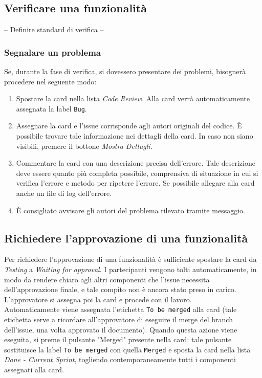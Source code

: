 \subsection{Verificare una funzionalità}
-- Definire standard di verifica --\\

\subsubsection{Segnalare un problema}
Se, durante la fase di verifica, si dovessero presentare dei problemi, bisognerà procedere nel seguente modo:
\begin{enumerate}
    \item Spostare la card nella lista \textit{Code Review}. Alla card verrà automaticamente assegnata la label \texttt{Bug}.
    \item Assegnare la card e l'issue corrisponde agli autori originali del codice. È possibile trovare tale informazione nei dettagli della card. In caso non siano visibili, premere il bottone \textit{Mostra Dettagli}.
    \item Commentare la card con una descrizione precisa dell'errore. Tale descrizione deve essere quanto più completa possibile, comprensiva di situazione in cui si verifica l'errore e metodo per ripetere l'errore. Se possibile allegare alla card anche un file di log dell'errore.
    \item È consigliato avvisare gli autori del problema rilevato tramite messaggio.
\end{enumerate}

\subsection{Richiedere l'approvazione di una funzionalità}
Per richiedere l'approvazione di una funzionalità è sufficiente spostare la card da \textit{Testing} a \textit{Waiting for approval}. I partecipanti vengono tolti automaticamente, in modo da rendere chiaro agli altri componenti che l'issue necessita dell'approvazione finale, e tale compito non è ancora stato preso in carico. 
L'approvatore si assegna poi la card e procede con il lavoro.\\
Automaticamente viene assegnata l'etichetta \texttt{To be merged} alla card (tale etichetta serve a ricordare all'approvatore di eseguire il merge del branch dell'issue, una volta approvato il documento).
Quando questa azione viene eseguita, si preme il pulsante "Merged" presente nella card: tale pulsante sostituisce la label \texttt{To be merged} con quella \texttt{Merged} e sposta la card nella lista \textit{Done - Current Sprint}, togliendo contemporaneamente tutti i componenti assegnati alla card.